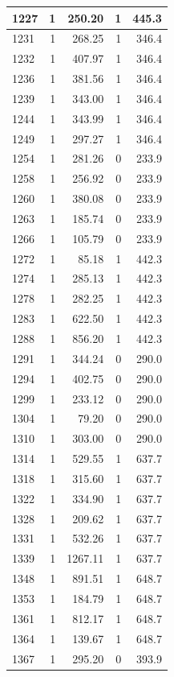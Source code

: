 \documentclass[
  12pt,
]{book}
\begin{document}
\begin{tabular}{l|r|r|r|r}
\hline
1227 & 1 & 250.20 & 1 & 445.3\\
\hline
1231 & 1 & 268.25 & 1 & 346.4\\
\hline
1232 & 1 & 407.97 & 1 & 346.4\\
\hline
1236 & 1 & 381.56 & 1 & 346.4\\
\hline
1239 & 1 & 343.00 & 1 & 346.4\\
\hline
1244 & 1 & 343.99 & 1 & 346.4\\
\hline
1249 & 1 & 297.27 & 1 & 346.4\\
\hline
1254 & 1 & 281.26 & 0 & 233.9\\
\hline
1258 & 1 & 256.92 & 0 & 233.9\\
\hline
1260 & 1 & 380.08 & 0 & 233.9\\
\hline
1263 & 1 & 185.74 & 0 & 233.9\\
\hline
1266 & 1 & 105.79 & 0 & 233.9\\
\hline
1272 & 1 & 85.18 & 1 & 442.3\\
\hline
1274 & 1 & 285.13 & 1 & 442.3\\
\hline
1278 & 1 & 282.25 & 1 & 442.3\\
\hline
1283 & 1 & 622.50 & 1 & 442.3\\
\hline
1288 & 1 & 856.20 & 1 & 442.3\\
\hline
1291 & 1 & 344.24 & 0 & 290.0\\
\hline
1294 & 1 & 402.75 & 0 & 290.0\\
\hline
1299 & 1 & 233.12 & 0 & 290.0\\
\hline
1304 & 1 & 79.20 & 0 & 290.0\\
\hline
1310 & 1 & 303.00 & 0 & 290.0\\
\hline
1314 & 1 & 529.55 & 1 & 637.7\\
\hline
1318 & 1 & 315.60 & 1 & 637.7\\
\hline
1322 & 1 & 334.90 & 1 & 637.7\\
\hline
1328 & 1 & 209.62 & 1 & 637.7\\
\hline
1331 & 1 & 532.26 & 1 & 637.7\\
\hline
1339 & 1 & 1267.11 & 1 & 637.7\\
\hline
1348 & 1 & 891.51 & 1 & 648.7\\
\hline
1353 & 1 & 184.79 & 1 & 648.7\\
\hline
1361 & 1 & 812.17 & 1 & 648.7\\
\hline
1364 & 1 & 139.67 & 1 & 648.7\\
\hline
1367 & 1 & 295.20 & 0 & 393.9\\

\end{tabular}
\end{document}
